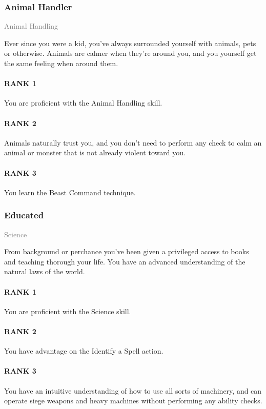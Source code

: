 \subsubsection{Animal Handler} \label{feat::animalhandler}
\small{\textcolor{gray}{Animal Handling}}

\normalsize
Ever since you were a kid, you've always surrounded yourself with animals, pets or otherwise.
Animals are calmer when they're around you, and you yourself get the same feeling when around them.
\paragraph{RANK 1} You are proficient with the Animal Handling skill.
\paragraph{RANK 2} Animals naturally trust you, and you don't need to perform any check to calm an animal or monster that is not already violent toward you.
\paragraph{RANK 3} You learn the Beast Command technique.

\subsubsection{Educated} \label{feat::educated}
\small{\textcolor{gray}{Science}}

\normalsize
From background or perchance you've been given a privileged access to books and teaching thorough your life.
You have an advanced understanding of the natural laws of the world.
\paragraph{RANK 1} You are proficient with the Science skill.
\paragraph{RANK 2} You have advantage on the Identify a Spell action.
\paragraph{RANK 3} You have an intuitive understanding of how to use all sorts of machinery, and can operate siege weapons and heavy machines without performing any ability checks.

